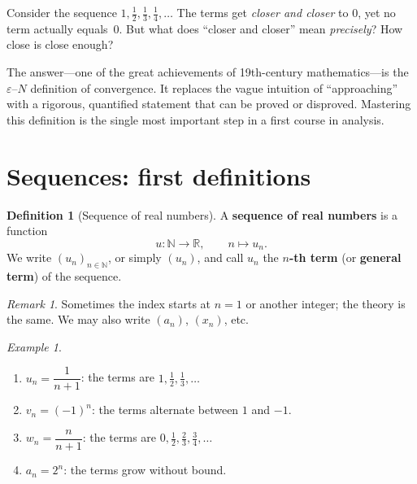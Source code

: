 \documentclass[12pt,a4paper,openany]{book}
\newcommand{\N}{\mathbb{N}}
\newcommand{\R}{\mathbb{R}}
\newcommand{\eps}{\varepsilon}
\theoremstyle{definition}
\newtheorem{definition}{Definition}[chapter]
\theoremstyle{remark}
\newtheorem{remark}{Remark}[chapter]
\newtheorem{example}{Example}[chapter]
\begin{document}
Consider the sequence $1, \frac{1}{2}, \frac{1}{3}, \frac{1}{4}, \ldots$ The terms get
\emph{closer and closer} to $0$, yet no term actually equals~$0$. But what does
``closer and closer'' mean \emph{precisely}? How close is close enough?

The answer---one of the great achievements of 19th-century mathematics---is the
$\eps$--$N$ definition of convergence. It replaces the vague intuition of
``approaching'' with a rigorous, quantified statement that can be proved or
disproved. Mastering this definition is the single most important step in a
first course in analysis.

\section{Sequences: first definitions}\label{sec:seq-def}

\begin{definition}[Sequence of real numbers]\label{def:sequence}
A \textbf{sequence of real numbers} is a function
\[
   u \colon \N \longrightarrow \R, \qquad n \longmapsto u_n.
\]
We write $(u_n)_{n\in\N}$, or simply $(u_n)$, and call $u_n$ the
\textbf{$n$-th term} (or \textbf{general term}) of the
sequence.
\end{definition}

\begin{remark}
Sometimes the index starts at $n=1$ or another integer; the theory is the same.
We may also write $(a_n)$, $(x_n)$, etc.
\end{remark}

\begin{example}\label{ex:first-sequences}
\leavevmode
\begin{enumerate}
\item $u_n = \dfrac{1}{n+1}$: the terms are $1, \frac{1}{2}, \frac{1}{3}, \ldots$
\item $v_n = (-1)^n$: the terms alternate between $1$ and $-1$.
\item $w_n = \dfrac{n}{n+1}$: the terms are $0, \frac{1}{2}, \frac{2}{3}, \frac{3}{4}, \ldots$
\item $a_n = 2^n$: the terms grow without bound.
\end{enumerate}
\end{example}

\end{document}
